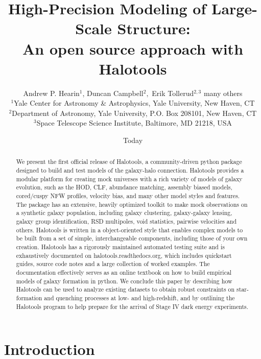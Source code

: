 \documentclass[usenatbib,usegraphicx,letterpaper]{mn2e}
\title[Halotools]
{
High-Precision Modeling of Large-Scale Structure: \\An open source approach with Halotools}
\author[Hearin et al.]
{Andrew P. Hearin$^{1}$, Duncan Campbell$^{2},$ Erik Tollerud$^{2,3}$\newauthor
many others \\
$^1$Yale Center for Astronomy \& Astrophysics, Yale University, New Haven, CT\\
$^2$Department of Astronomy, Yale University, P.O. Box 208101, New Haven, CT\\
$^3$Space Telescope Science Institute, Baltimore, MD 21218, USA}
\date{Today}
\begin{document}
\maketitle

\begin{abstract}

We  present the first official release of Halotools, a community-driven python package designed to build and test models of the galaxy-halo connection. Halotools provides a modular platform for creating mock universes with a rich variety of models of galaxy evolution, such as the HOD, CLF, abundance matching, assembly biased models, cored/cuspy NFW profiles, velocity bias, and many other model styles and features. The package has an extensive, heavily optimized toolkit to make mock observations on a synthetic galaxy population, including galaxy clustering, galaxy-galaxy lensing, galaxy group identification, RSD multipoles, void statistics, pairwise velocities and others. Halotools is written in a object-oriented style that enables complex models to be built from a set of simple, interchangeable components, including those of your own creation. Halotools has a rigorously maintained automated testing suite and is exhaustively documented on halotools.readthedocs.org, which includes quickstart guides, source code notes and a large collection of worked examples. The documentation effectively serves as an online textbook on how to build empirical models of galaxy formation in python. We conclude this paper by describing how Halotools can be used to analyze existing datasets to obtain robust constraints on star-formation and quenching processes at low- and high-redshift, and by outlining the Halotools program to help prepare for the arrival of Stage IV dark energy experiments.

\end{abstract} 

\section{Introduction}
\label{section:introduction}




\end{document}
